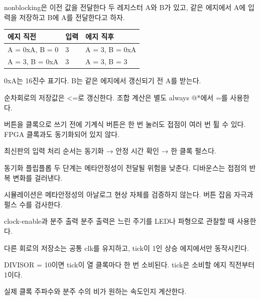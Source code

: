 \begin{frame}{nonblocking은 이전 값을 전달한다}
\small
두 레지스터 A와 B가 있고, 같은 에지에서 A에 입력을 저장하고 B에 A를 전달한다고 하자.\par\begin{center}\renewcommand{\arraystretch}{1.55}\begin{tabular}{lll}
에지 직전 & 입력 & 에지 직후\\\hline
A = 0xA, B = 0 & 3 & A = 3, B = 0xA\\
A = 3, B = 0xA & 3 & A = 3, B = 3\\
\end{tabular}\end{center}0xA는 16진수 표기다. B는 같은 에지에서 갱신되기 전 A를 받는다.\par\vspace{0.26cm}순차회로의 저장값은 <=로 갱신한다. 조합 계산은 별도 always @*에서 =를 사용한다.\par
\end{frame}

\begin{frame}{버튼을 클록으로 쓰기 전에}
\small
기계식 버튼은 한 번 눌러도 접점이 여러 번 튈 수 있다. FPGA 클록과도 동기화되어 있지 않다.\par\vspace{0.26cm}최신판의 입력 처리 순서는 동기화 → 안정 시간 확인 → 한 클록 펄스다.\par\vspace{0.26cm}동기화 플립플롭 두 단계는 메타안정성이 전달될 위험을 낮춘다. 디바운스는 접점의 반복 변화를 걸러낸다.\par\vspace{0.26cm}시뮬레이션은 메타안정성의 아날로그 현상 자체를 검증하지 않는다. 버튼 잡음 자극과 펄스 수를 검사한다.\par
\end{frame}

\begin{frame}{clock-enable과 분주 출력}
\small
분주 출력은 느린 주기를 LED나 파형으로 관찰할 때 사용한다.\par\vspace{0.26cm}다른 회로의 저장소는 공통 clk를 유지하고, tick이 1인 상승 에지에서만 동작시킨다.\par\vspace{0.26cm}DIVISOR = 10이면 tick이 열 클록마다 한 번 소비된다. tick은 소비할 에지 직전부터 1이다.\par\vspace{0.26cm}실제 클록 주파수와 분주 수의 비가 원하는 속도인지 계산한다.\par
\end{frame}

